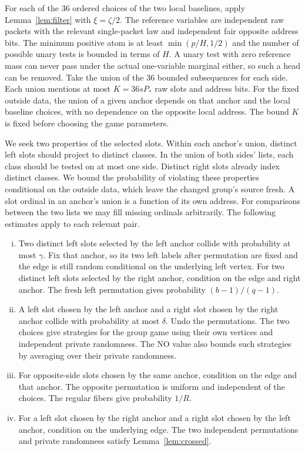 \documentclass[11pt]{article}
\begin{document}
For each of the 36 ordered choices of the two local baselines, apply
Lemma~\ref{lem:filter} with $\xi=\zeta/2$. The reference variables are
independent raw packets with the relevant single-packet law and
independent fair opposite address bits. The minimum positive atom is
at least $\min(p/H,1/2)$ and the number of possible unary tests is
bounded in terms of $H$. A unary test with zero reference mass can
never pass under the actual one-variable marginal either, so such a
head can be removed. Take the union of the 36 bounded subsequences
for each side. Each union mentions at most $K=36sP_*$ raw slots and
address bits. For the fixed outside data, the union of a given anchor
depends on that anchor and the local baseline choices, with no
dependence on the opposite local address. The bound $K$ is fixed
before choosing the game parameters.

We seek two properties of the selected slots. Within each anchor's
union, distinct left slots should project to distinct classes. In the
union of both sides' lists, each class should be tested on at most one
side. Distinct right slots already index distinct classes. We bound
the probability of violating these properties conditional on the
outside data, which leave the changed group's source fresh. A slot
ordinal in an anchor's union is a function of its own address.
For comparisons between the two lists we may fill missing ordinals
arbitrarily. The following estimates apply to each relevant pair.

\begin{enumerate}[(i)]
\item Two distinct left slots selected by the left anchor collide with
probability at most $\gamma$. Fix that anchor, so its two left labels
after permutation are fixed and the edge is still random conditional
on the underlying left vertex. For two distinct left slots selected
by the right anchor, condition on the edge and right anchor. The
fresh left permutation gives probability $(b-1)/(q-1)$.
\item A left slot chosen by the left anchor and a right slot chosen by
the right anchor collide with probability at most $\delta$. Undo
the permutations. The two choices give strategies for the group game
using their own vertices and independent private randomness. The NO
value also bounds such strategies by averaging over their private
randomness.
\item For opposite-side slots chosen by the same anchor, condition on
the edge and that anchor. The opposite permutation is uniform and
independent of the choices. The regular fibers give probability $1/R$.
\item For a left slot chosen by the right anchor and a right slot
chosen by the left anchor, condition on the underlying edge.
The two independent permutations and private randomness satisfy
Lemma~\ref{lem:crossed}.
\end{enumerate}
\end{document}
